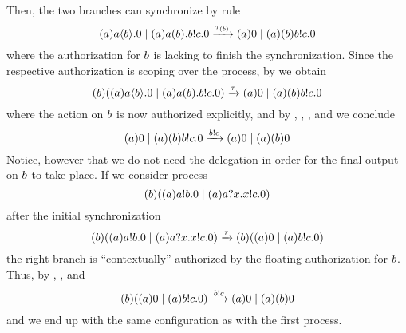 Then, the two branches can synchronize by rule 
\[
(a)a\langle b\rangle.0 
\;|\; 
(a)a(b).b!c.0
\xrightarrow{\tau_{(b)}}
(a)0 
\;|\; 
(a)(b)b!c.0
\]
where the authorization for $b$ is lacking to finish the synchronization. 
Since the respective authorization is scoping over the process, by  we obtain 
\[
(b)((a)a\langle b\rangle.0 
\;|\; 
(a)a(b).b!c.0)
\xrightarrow{\tau}
(a)0 
\;|\; 
(a)(b)b!c.0
\]
where the action on $b$ is now authorized explicitly, and by , , , and  we conclude
\[
(a)0 
\;|\; 
(a)(b)b!c.0
\xrightarrow{b!c}
(a)0 
\;|\; 
(a)(b)0
\] 
Notice, however that we do not need the delegation in order for the final output on $b$ to take place. If we consider process
\[
(b)((a)a!b.0 
\;|\; 
(a)a?x.x!c.0)
\]
after the initial synchronization 
\[
(b)((a)a!b.0 
\;|\; 
(a)a?x.x!c.0)
\xrightarrow{\tau}
(b)((a)0 
\;|\; 
(a)b!c.0)
\]
the right branch is ``contextually'' authorized by the floating authorization for $b$. Thus, by  , , and  
\[
(b)((a)0 
\;|\; 
(a)b!c.0)
\xrightarrow{b!c}
(a)0 
\;|\; 
(a)(b)0
\]
and we end up with the same configuration as with the first process. 




